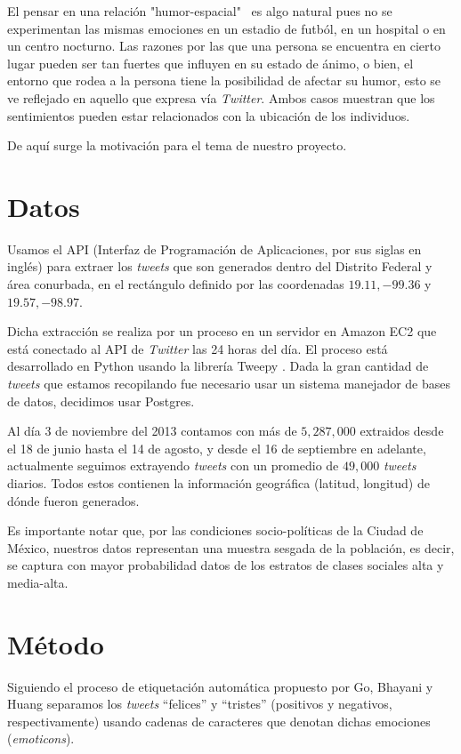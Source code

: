\documentclass{article}
\begin{document}
		El pensar en una relación "humor-espacial" \ es algo natural pues no se experimentan las mismas emociones en un estadio de futból, en un hospital o en un centro nocturno. Las razones por las que una persona se encuentra en cierto lugar pueden ser tan fuertes que influyen en su estado de ánimo, o bien, el entorno que rodea a la persona tiene la posibilidad de afectar su humor, esto se ve reflejado en aquello que expresa vía \emph{Twitter}. Ambos casos muestran que los sentimientos pueden estar relacionados con la ubicación de los individuos.
		
		De aquí surge la motivación para el tema de nuestro proyecto.
		
	\section{Datos}
		Usamos el API (Interfaz de Programación de Aplicaciones, por sus siglas en inglés) para extraer los \emph{tweets} que son generados dentro del Distrito Federal y área conurbada, en el rectángulo definido por las coordenadas $19.11,-99.36$ y $19.57,-98.97$.
		
        Dicha extracción se realiza por un proceso en un servidor en Amazon EC2 que está conectado al API de \emph{Twitter} las 24 horas del día. El proceso está desarrollado en Python usando la librería Tweepy \cite{tweepy}. Dada la gran cantidad de \emph{tweets} que estamos recopilando fue necesario usar un sistema manejador de bases de datos, decidimos usar Postgres.

		Al día 3 de noviembre del 2013 contamos con más de $5,287,000$ extraidos desde el 18 de junio hasta el 14 de agosto, y desde el 16 de septiembre en adelante, actualmente seguimos extrayendo \emph{tweets} con un promedio de $49,000$ \emph{tweets} diarios. Todos estos contienen la información geográfica (latitud, longitud) de dónde fueron generados.

		Es importante notar que, por las condiciones socio-políticas de la Ciudad de México, nuestros datos representan una muestra sesgada de la población, es decir, se captura con mayor probabilidad datos de los estratos de clases sociales alta y media-alta. 

	\section{Método}
	    Siguiendo el proceso de etiquetación automática propuesto por Go, Bhayani y Huang \cite{Go} separamos los \emph{tweets} ``felices''  y ``tristes'' (positivos y negativos, respectivamente) usando cadenas de caracteres que denotan dichas emociones (\emph{emoticons}).
	    
\end{document}
